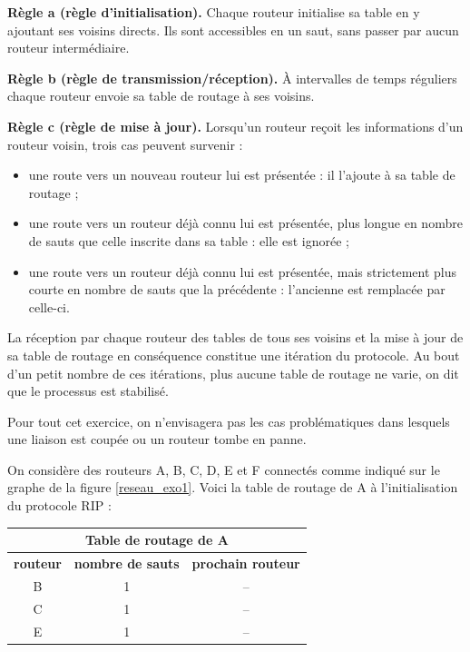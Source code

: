 \textbf{Règle a (règle d’initialisation).} Chaque routeur initialise sa table en y ajoutant ses voisins directs. Ils sont accessibles en un saut, sans passer par aucun routeur intermédiaire.\par
\textbf{Règle b (règle de transmission/réception).} À intervalles de temps réguliers chaque routeur envoie sa table de routage à ses voisins.\par 
\textbf{Règle c (règle de mise à jour).} Lorsqu’un routeur reçoit les informations d’un routeur voisin, trois cas peuvent survenir :

\begin{itemize}
    \item une route vers un nouveau routeur lui est présentée : il l’ajoute à sa table de routage ;
    \item une route vers un routeur déjà connu lui est présentée, plus longue en nombre de sauts que celle inscrite dans sa table : elle est ignorée ;
    \item une route vers un routeur déjà connu lui est présentée, mais strictement plus courte en nombre de sauts que la précédente : l’ancienne est remplacée par celle-ci.

\end{itemize}

La réception par chaque routeur des tables de tous ses voisins et la mise à jour de sa table de routage en conséquence constitue une itération du protocole. Au bout d’un petit nombre de ces itérations, plus aucune table de routage ne varie, on dit que le processus est stabilisé.
\par 
Pour tout cet exercice, on n’envisagera pas les cas problématiques dans lesquels une liaison est coupée ou un routeur tombe en panne.

\par 
\begin{minipage}{0.48\linewidth}
    On considère des routeurs A, B, C, D, E et F connectés comme indiqué sur le graphe de la figure \ref{reseau_exo1}.
\medskip 
Voici la table de routage de A à l’initialisation du protocole RIP :

\end{minipage}\hfill{}
\begin{minipage}{0.52\linewidth}
    \centering
    \renewcommand{\arraystretch}{1.5} %
    \begin{tabular}{|c|c|c|}
        \hline
        \multicolumn{3}{|c|}{\textbf{Table de routage de A}} \\
        \hline
        \textbf{routeur} & \textbf{nombre de sauts} & \textbf{prochain routeur} \\
        \hline
        B & 1 & -- \\
        \hline
        C & 1 & -- \\
        \hline
        E & 1 & -- \\
        \hline
    \end{tabular}
\end{minipage}



